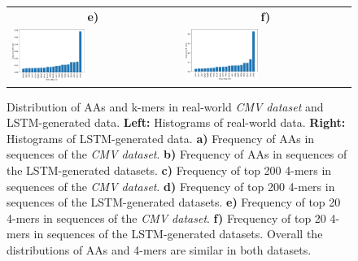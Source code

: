 \documentclass[oneside]{book}
\begin{document}
\begin{figure}[htp]
\begin{center}
{\begin{tabular}{ll}
    \multicolumn{1}{c}{\textbf{e)}} & \multicolumn{1}{c}{\textbf{f)}}\\
    \includegraphics[width=0.45\textwidth]{figures/cmv_analysis/4mer_top20_hist_2.pdf}&
    \includegraphics[width=0.45\textwidth]{figures/lstm_simulated_analysis/4mer_top20_hist_2.pdf}\\
    \end{tabular}
    }%
    \endgroup
   \caption[Distribution of AAs and k-mers]{Distribution of AAs and k-mers in 
   real-world \emph{CMV dataset} and 
   LSTM-generated data.
   \textbf{Left:} Histograms of real-world data.
   \textbf{Right:} Histograms of LSTM-generated data.
   \textbf{a)} Frequency of AAs in sequences of the \emph{CMV dataset}.
   \textbf{b)} Frequency of AAs in sequences of the LSTM-generated datasets.
   \textbf{c)} Frequency of top 200 4-mers in sequences of the \emph{CMV dataset}.
   \textbf{d)} Frequency of top 200 4-mers in sequences of the LSTM-generated datasets.
   \textbf{e)} Frequency of top 20 4-mers in sequences of the \emph{CMV dataset}.
   \textbf{f)} Frequency of top 20 4-mers in sequences of the LSTM-generated datasets. 
   Overall the distributions of AAs and 4-mers are similar in both datasets.}
   \label{tab:lstm_gen_hists}
   \end{center}
\end{figure}

%

%
    
%
    
%
    
%
    
%

%
\end{document}
